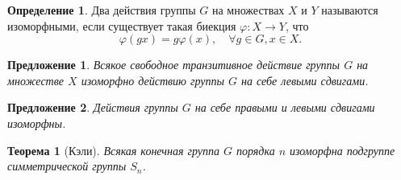 \documentclass[a4paper]{article}
\theoremstyle{plain}
\newtheorem*{theorem}{Теорема}
\newtheorem{proposal}{Предложение}
\theoremstyle{definition}
\newtheorem{definition}{Определение}
\numberwithin{definition}{section}
\numberwithin{proposal}{section}
\begin{document}
\begin{definition}
Два действия группы \(G\) на множествах \(X\) и \(Y\) называются изоморфными, если существует такая биекция \(\varphi: X \rightarrow Y\), что
\begin{equation*}
	\varphi(gx) = g\varphi(x), \quad \forall g \in G, x \in X.
\end{equation*}
\end{definition}

\begin{proposal}
Всякое свободное транзитивное действие группы \(G\) на множестве \(X\) изоморфно действию группы \(G\) на себе левыми сдвигами.
\end{proposal}

\begin{proposal}
Действия группы \(G\) на себе правыми и левыми сдвигами изоморфны.
\end{proposal}

\begin{theorem}[Кэли]
Всякая конечная группа \(G\) порядка \(n\) изоморфна подгруппе симметрической группы \(S_n\).
\end{theorem}
\end{document}
